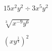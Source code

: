 \item $15x^{2}y^2 \div 3x^5 y^{2}$
\item $\sqrt[3]{x^{-9} y^{6}}$
\item $\displaystyle \left( x y^{\frac{1}{4}}\right)^2$
